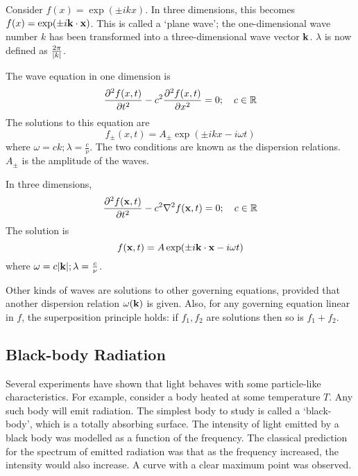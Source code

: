 Consider \( f(x) = \exp(\pm i k x) \).
In three dimensions, this becomes \( f(x) = \exp(\pm i \vb k \cdot \vb x) \).
This is called a `plane wave'; the one-dimensional wave number \( k \) has been transformed into a three-dimensional wave vector \( \vb k \).
\( \lambda \) is now defined as \( \frac{2\pi}{\abs{k}} \).

The wave equation in one dimension is
\[
	\pdv[2]{f(x,t)}{t} - c^2 \pdv[2]{f(x,t)}{x} = 0;\quad c \in \mathbb R
\]
The solutions to this equation are
\[
	f_\pm (x,t) = A_\pm \exp(\pm i k x - i \omega t)
\]
where \( \omega = c k; \lambda = \frac{c}{\nu} \).
The two conditions are known as the dispersion relations.
\( A_\pm \) is the amplitude of the waves.

In three dimensions,
\[
	\pdv[2]{f(\vb x,t)}{t} - c^2 \laplacian f(\vb x,t) = 0;\quad c \in \mathbb R
\]
The solution is
\[
	f (\vb x,t) = A \exp(\pm i \vb k \cdot \vb x - i \omega t)
\]
where \( \omega = c \abs{\vb k}; \lambda = \frac{c}{\nu} \).

\begin{note}
	Other kinds of waves are solutions to other governing equations, provided that another dispersion relation \( \omega(\vb k) \) is given.
	Also, for any governing equation linear in \( f \), the superposition principle holds: if \( f_1, f_2 \) are solutions then so is \( f_1 + f_2 \).
\end{note}

\subsection{Black-body Radiation}
Several experiments have shown that light behaves with some particle-like characteristics.
For example, consider a body heated at some temperature \( T \).
Any such body will emit radiation.
The simplest body to study is called a `black-body', which is a totally absorbing surface.
The intensity of light emitted by a black body was modelled as a function of the frequency.
The classical prediction for the spectrum of emitted radiation was that as the frequency increased, the intensity would also increase.
A curve with a clear maximum point was observed.
